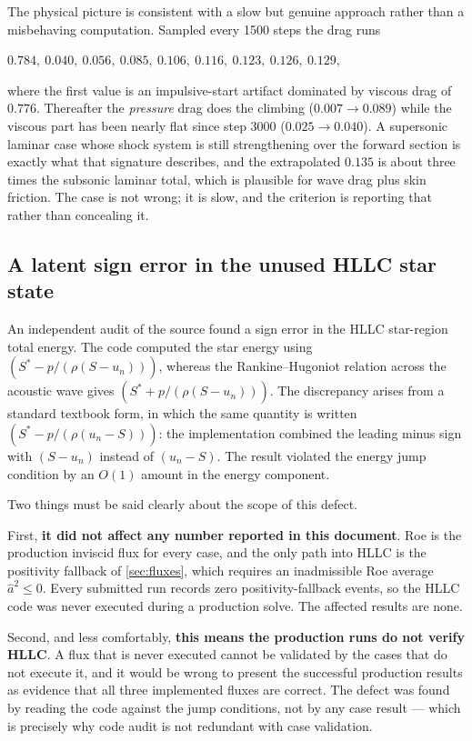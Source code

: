 The physical picture is consistent with a slow but genuine approach rather than a
misbehaving computation. Sampled every \num{1500} steps the drag runs
\begin{center}
  $0.784,\ 0.040,\ 0.056,\ 0.085,\ 0.106,\ 0.116,\ 0.123,\ 0.126,\ 0.129$,
\end{center}
where the first value is an
impulsive-start artifact dominated by viscous drag of $0.776$. Thereafter the
\emph{pressure} drag does the climbing ($0.007\to0.089$) while the viscous part has been
nearly flat since step \num{3000} ($0.025\to0.040$). A supersonic laminar case whose shock
system is still strengthening over the forward section is exactly what that signature
describes, and the extrapolated $0.135$ is about three times the subsonic laminar total,
which is plausible for wave drag plus skin friction. The case is not wrong; it is slow,
and the criterion is reporting that rather than concealing it.

\subsection{A latent sign error in the unused HLLC star state}
\label{sec:hllcbug}

An independent audit of the source found a sign error in the HLLC star-region
total energy. The code computed the star energy using
$\left(S^\ast-p/(\rho(S-u_n))\right)$, whereas the Rankine--Hugoniot relation
across the acoustic wave gives $\left(S^\ast+p/(\rho(S-u_n))\right)$. The
discrepancy arises from a standard textbook form, in which the same quantity is
written $\left(S^\ast-p/(\rho(u_n-S))\right)$: the implementation combined the
leading minus sign with $(S-u_n)$ instead of $(u_n-S)$. The result violated the
energy jump condition by an $O(1)$ amount in the energy component.

Two things must be said clearly about the scope of this defect.

First, \textbf{it did not affect any number reported in this document}. Roe is the
production inviscid flux for every case, and the only path into HLLC is the
positivity fallback of \cref{sec:fluxes}, which requires an inadmissible Roe
average $\hat{a}^2\le0$. Every submitted run records zero positivity-fallback
events, so the HLLC code was never executed during a production solve. The
affected results are none.

Second, and less comfortably, \textbf{this means the production runs do not
verify HLLC}. A flux that is never executed cannot be validated by the cases that
do not execute it, and it would be wrong to present the successful production
results as evidence that all three implemented fluxes are correct. The defect was
found by reading the code against the jump conditions, not by any case result ---
which is precisely why code audit is not redundant with case validation.

